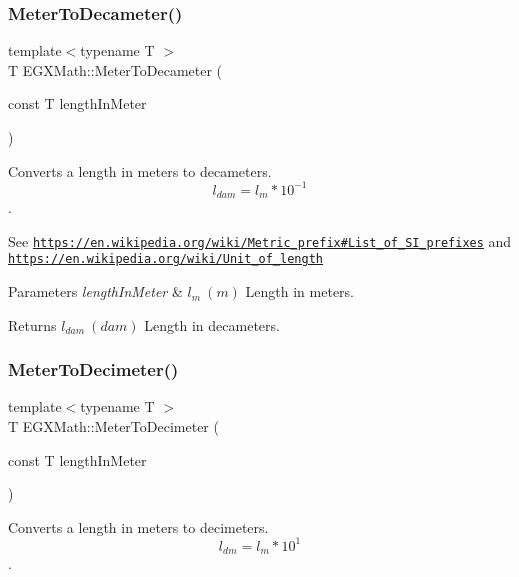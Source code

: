 \subsubsection{\texorpdfstring{Meter\+To\+Decameter()}{MeterToDecameter()}}
{\footnotesize\ttfamily template$<$typename T $>$ \\
T E\+G\+X\+Math\+::\+Meter\+To\+Decameter (\begin{DoxyParamCaption}\item[{const T}]{length\+In\+Meter }\end{DoxyParamCaption})}



Converts a length in meters to decameters. \[ l_{dam}=l_{m} * 10^{-1} \]. 

See \href{https://en.wikipedia.org/wiki/Metric_prefix#List_of_SI_prefixes}{\tt https\+://en.\+wikipedia.\+org/wiki/\+Metric\+\_\+prefix\#\+List\+\_\+of\+\_\+\+S\+I\+\_\+prefixes} and \href{https://en.wikipedia.org/wiki/Unit_of_length}{\tt https\+://en.\+wikipedia.\+org/wiki/\+Unit\+\_\+of\+\_\+length} 
\begin{DoxyParams}{Parameters}
{\em length\+In\+Meter} & $ l_{m}\ (m)$ Length in meters. \\
\hline
\end{DoxyParams}
\begin{DoxyReturn}{Returns}
$ l_{dam}\ (dam)$ Length in decameters. 
\end{DoxyReturn}
\mbox{\label{group___e_g_x_math-_conversions-_length_conversions-_s_i-_meter-_s_i_ga4caa9cd21d4f78039b1ceddf1f0ea5fd}} 
\subsubsection{\texorpdfstring{Meter\+To\+Decimeter()}{MeterToDecimeter()}}
{\footnotesize\ttfamily template$<$typename T $>$ \\
T E\+G\+X\+Math\+::\+Meter\+To\+Decimeter (\begin{DoxyParamCaption}\item[{const T}]{length\+In\+Meter }\end{DoxyParamCaption})}



Converts a length in meters to decimeters. \[ l_{dm}=l_{m} * 10^{1} \]. 

